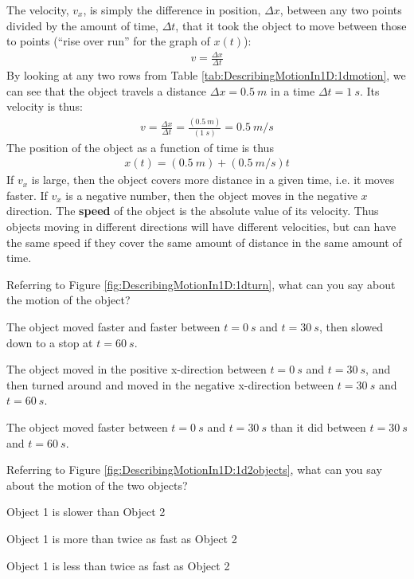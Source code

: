 The velocity, $v_x$, is simply the difference in position, $\Delta x$, between any two points divided by the amount of time, $\Delta t$, that it took the object to move between those to points (``rise over run'' for the graph of $x(t)$):
\begin{align*}
v = \frac{\Delta x}{\Delta t}
\end{align*}
By looking at any two rows from Table \ref{tab:DescribingMotionIn1D:1dmotion}, we can see that the object travels a distance $\Delta x=\SI{0.5}{m}$ in a time $\Delta t=\SI{1}{s}$. Its velocity is thus:
\begin{align*}
v = \frac{\Delta x}{\Delta t} = \frac{(\SI{0.5}{m})}{(\SI{1}{s})}=\SI{0.5}{m/s}
\end{align*}
The position of the object as a function of time is thus
\begin{align*}
x(t) = (\SI{0.5}{m}) + (\SI{0.5}{m/s}) t
\end{align*}
If $v_x$ is large, then the object covers more distance in a given time, i.e. it moves faster. If $v_x$ is a negative number, then the object moves in the negative $x$ direction. The \textbf{speed} of the object is the absolute value of its velocity. Thus objects moving in different directions will have different velocities, but can have the same speed if they cover the same amount of distance in the same amount of time.
\newpage
\begin{checkpoint}
\begin{MCquestion}{Referring to Figure \ref{fig:DescribingMotionIn1D:1dturn}, what can you say about the motion of the object? }
\item The object moved faster and faster between $t=\SI{0}{s}$ and $t=\SI{30}{s}$, then slowed down to a stop at $t=\SI{60}{s}$.
\item The object moved in the positive x-direction between $t=\SI{0}{s}$ and $t=\SI{30}{s}$, and then turned around and moved in the negative x-direction between $t=\SI{30}{s}$ and $t=\SI{60}{s}$. \correct
\item The object moved faster between $t=\SI{0}{s}$ and $t=\SI{30}{s}$ than it did between $t=\SI{30}{s}$ and $t=\SI{60}{s}$.
\end{MCquestion}
\end{checkpoint}

\begin{checkpoint}
\begin{MCquestion}{Referring to Figure \ref{fig:DescribingMotionIn1D:1d2objects}, what can you say about the motion of the two objects? }
\item Object 1 is slower than Object 2
\item Object 1 is more than twice as fast as Object 2 \correct
\item Object 1 is less than twice as fast as Object 2
\end{MCquestion}
\end{checkpoint}


